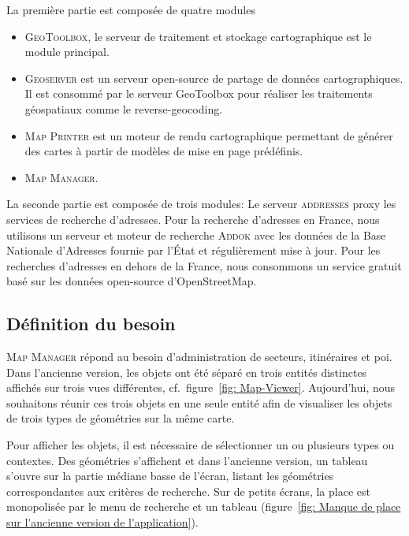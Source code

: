 \documentclass{rapportUHA40}
\begin{document}
La première partie est composée de quatre modules
\begin{itemize}
  \item \textsc{GeoToolbox}, le serveur de
        traitement et stockage cartographique est le module principal.
  \item \textsc{Geoserver} est un serveur open-source de partage de données cartographiques.
        Il est consommé par le serveur GeoToolbox pour réaliser les traitements
        géospatiaux comme le \gls{reverse-geocoding}.
  \item \textsc{Map Printer} est un moteur de rendu cartographique permettant de générer
        des cartes à partir de modèles de mise en page prédéfinis.
  \item \textsc{Map Manager}.
\end{itemize}

La seconde partie est composée de trois modules: Le serveur \textsc{addresses}
\gls{proxy} les services de recherche d'adresses. Pour la recherche d'adresses
en France, nous utilisons un serveur et moteur de recherche \textsc{Addok} avec
les données de la Base Nationale d'Adresses fournie par l'État et régulièrement
mise à jour. Pour les recherches d'adresses en dehors de la France, nous
consommons un service gratuit basé sur les données open-source d'OpenStreetMap.


\subsection{Définition du besoin}
\textsc{Map Manager} répond au besoin d'administration de secteurs, itinéraires
et poi. Dans l'ancienne version, les objets ont été séparé en trois entités
distinctes affichés sur trois vues différentes, cf.\ figure~\ref{fig:
  Map-Viewer}. Aujourd'hui, nous souhaitons réunir ces trois objets en une seule
entité afin de visualiser les objets de trois types de géométries sur la même
carte. 

Pour afficher les objets, il est nécessaire de sélectionner un ou plusieurs
types ou contextes. Des géométries s'affichent et dans l'ancienne version, un
tableau s'ouvre sur la partie médiane basse de l'écran, listant les géométries
correspondantes aux critères de recherche. Sur de petits écrans, la place est
monopolisée par le menu de recherche et un tableau (figure~\ref{fig: Manque de
  place sur l'ancienne version de l'application}).
\end{document}
